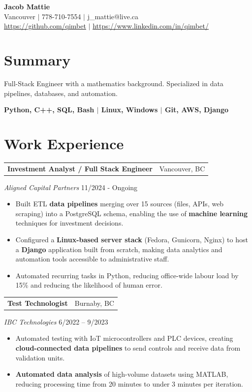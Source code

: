 \documentclass[a4paper,10pt]{article}
\makeatletter
\newcommand{\work}[5]{
	{
		\vspace{1.5mm}
		\noindent
		\begin{tabular*}{\textwidth}{@{\extracolsep{\fill}} l r}
			\textbf{#1} & #2 \\
		\end{tabular*}
		\vspace{-5mm}
		\textit{#3} \hfill #4 \\
		\begin{itemize}
			\setlength{\itemsep}{-1mm}
			\setlength{\topsep}{0mm}
			\setlength{\parsep}{0mm}
			#5
		\end{itemize}
	}
}
\makeatother
\begin{document}
	\begin{center}
		{\huge \bfseries Jacob Mattie} \\[0.5em]
		Vancouver $|$ 778-710-7554 $|$ j\_mattie@live.ca \\
		\href{https://github.com/qimbet}{https://github.com/qimbet} $|$ \href{https://www.linkedin.com/in/qimbet/}{https://www.linkedin.com/in/qimbet/}
	\end{center}
	
	\vspace{-1.25em}
	
	\section*{Summary}
		Full-Stack Engineer with a mathematics background. Specialized in data pipelines, databases, and automation. 
		\begin{center}
			\textbf{
				Python, C++, SQL, Bash \quad $|$ \quad Linux, Windows \quad $|$ \quad Git, AWS, Django
			}
		\end{center}
	
\breaker

\section*{Work Experience}
		
	\work
	{Investment Analyst / Full Stack Engineer}
	{Vancouver, BC}
	{Aligned Capital Partners}
	{11/2024 - Ongoing}
	{				
		\item Built ETL \textbf{data pipelines} merging over 15 sources (files, APIs, web scraping) into a PostgreSQL schema, enabling the use of \textbf{machine learning} techniques for investment decisions.
		
		\item Configured a \textbf{Linux-based server stack} (Fedora, Gunicorn, Nginx) to host a \textbf{Django} application built from scratch, making data analytics and automation tools accessible to administrative staff.
		
		\item Automated recurring tasks in Python, reducing office-wide labour load by 15\% and reducing the likelihood of human error.
	}

	
	\work
	{Test Technologist}
	{Burnaby, BC}
	{IBC Technologies}
	{6/2022 – 9/2023}
	{	
		\item Automated testing with IoT microcontrollers and PLC devices, creating \textbf{cloud-connected data pipelines} to send controls and receive data from validation units.
		
		\item \textbf{Automated data analysis} of high-volume datasets using MATLAB, reducing processing time from 20 minutes to under 3 minutes per iteration.
	}
\end{document}
